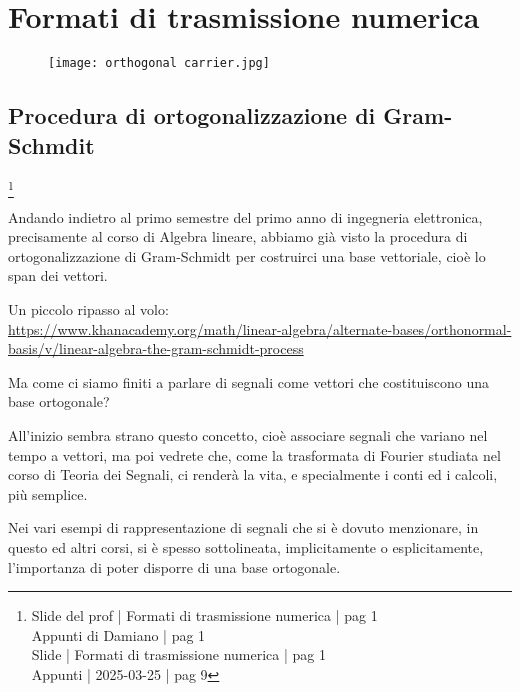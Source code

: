\chapter{Formati di trasmissione numerica}

\begin{figure}[h]
    \centering
    \texttt{[image: orthogonal carrier.jpg]}
\end{figure}

\newpage 

\section{Procedura di ortogonalizzazione di Gram-Schmdit}
\footnote{Slide del prof | Formati di trasmissione numerica | pag 1 \\  
Appunti di Damiano | pag 1 \\
Slide | Formati di trasmissione numerica | pag  1\\
Appunti | 2025-03-25 | pag 9
}

\begin{tcolorbox}
    Andando indietro al primo semestre del primo anno di ingegneria elettronica, 
    precisamente al corso di Algebra lineare, abbiamo già visto la procedura di ortogonalizzazione di Gram-Schmidt per costruirci una base vettoriale, cioè lo span dei vettori. \newline 

    Un piccolo ripasso al volo: \\
    \url{https://www.khanacademy.org/math/linear-algebra/alternate-bases/orthonormal-basis/v/linear-algebra-the-gram-schmidt-process} \newline 

    Ma come ci siamo finiti a parlare di segnali come vettori che costituiscono una base ortogonale? \newline 

    All'inizio sembra strano questo concetto, cioè associare segnali che variano nel tempo a vettori, ma poi vedrete che, come la trasformata di Fourier studiata nel corso di Teoria dei Segnali, 
    ci renderà la vita, e specialmente i conti ed i calcoli, più semplice. 
\end{tcolorbox}

Nei vari esempi di rappresentazione di segnali che si è dovuto menzionare, in questo ed altri corsi, 
si è spesso sottolineata, implicitamente o esplicitamente, l'importanza di poter disporre di una base ortogonale. \newline 

